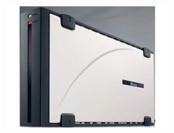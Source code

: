 \documentclass[cjk,dvipdfm,12pt]{beamer}
\begin{document}
\begin{frame}
\begin{minipage}[t]{0.4\hsize}
  \includegraphics[width=1.0\hsize]{image200705/PX-EH16L.png}
 \end{minipage} 

\end{frame}
\end{document}
